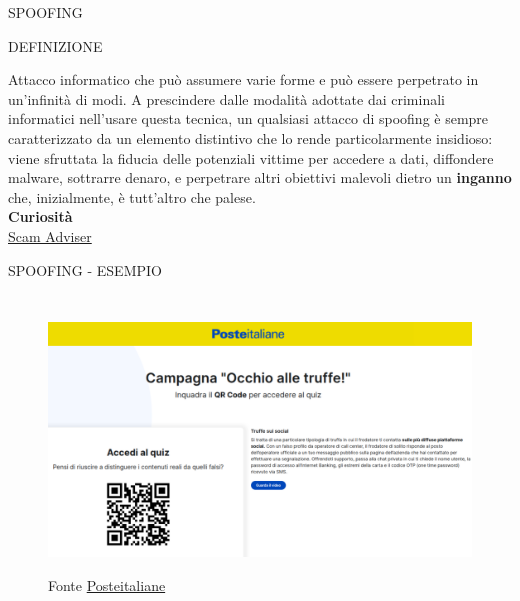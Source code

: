 \documentclass[aspectratio=1610]{beamer}
\begin{document}
\begin{frame}{SPOOFING}
    \begin{alertblock}{DEFINIZIONE}
        \begin{minipage}{0.98\linewidth}
            \justifying
            Attacco informatico che può assumere varie forme e può essere perpetrato in un'infinità di modi. 
            A prescindere dalle modalità adottate dai criminali informatici nell'usare questa tecnica, 
            un qualsiasi attacco di spoofing è sempre caratterizzato da un elemento distintivo che lo 
            rende particolarmente insidioso: viene sfruttata la fiducia delle potenziali vittime per accedere a 
            dati, diffondere malware, sottrarre denaro, e perpetrare altri obiettivi malevoli dietro un 
            \textbf{inganno} che, inizialmente, è tutt'altro che palese.\\
            \bigskip
            \tiny{\textbf{Curiosità}}\\
            \tiny{\href{https://www.scamadviser.com/}{Scam Adviser}}
        \end{minipage}
    \end{alertblock}
\end{frame}

\begin{frame}{SPOOFING - ESEMPIO}
    \begin{columns}
        \column{\textwidth}
            \begin{figure}
                \href{https://www.poste.it/sicurezza-online/guide-per-operare-in-sicurezza/come-difendersi-dalle-truffe/}{\includegraphics[width=\linewidth]{img/spoofing.png}}
                \caption{{Fonte \href{https://www.poste.it/sicurezza-online/guide-per-operare-in-sicurezza/come-difendersi-dalle-truffe/}{Posteitaliane}}}
            \end{figure}
    \end{columns}
\end{frame}
\end{document}
